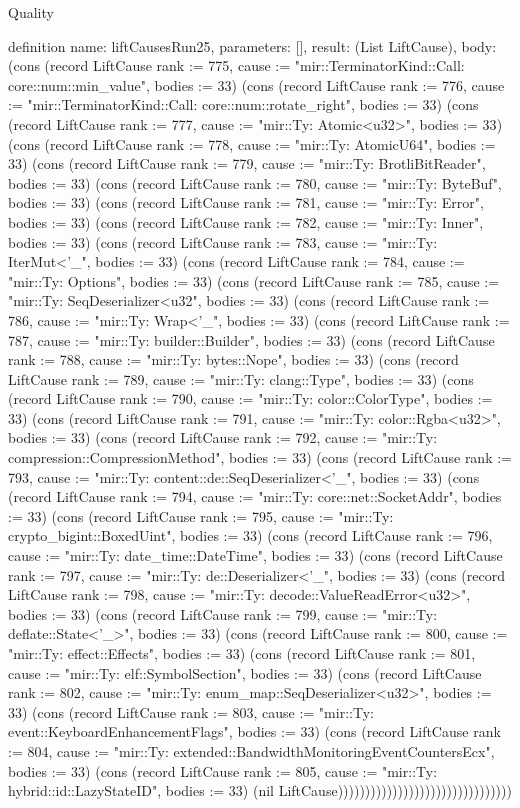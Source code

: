 \begin{lexlean}{Quality}
\begin{semanticmodule}
definition{
  name: liftCausesRun25,
  parameters: [],
  result: (List LiftCause),
  body: (cons (record LiftCause {rank := 775, cause := "mir::TerminatorKind::Call: core::num::min_value", bodies := 33}) (cons (record LiftCause {rank := 776, cause := "mir::TerminatorKind::Call: core::num::rotate_right", bodies := 33}) (cons (record LiftCause {rank := 777, cause := "mir::Ty: Atomic<u32>", bodies := 33}) (cons (record LiftCause {rank := 778, cause := "mir::Ty: AtomicU64", bodies := 33}) (cons (record LiftCause {rank := 779, cause := "mir::Ty: BrotliBitReader", bodies := 33}) (cons (record LiftCause {rank := 780, cause := "mir::Ty: ByteBuf", bodies := 33}) (cons (record LiftCause {rank := 781, cause := "mir::Ty: Error", bodies := 33}) (cons (record LiftCause {rank := 782, cause := "mir::Ty: Inner", bodies := 33}) (cons (record LiftCause {rank := 783, cause := "mir::Ty: IterMut<'_", bodies := 33}) (cons (record LiftCause {rank := 784, cause := "mir::Ty: Options", bodies := 33}) (cons (record LiftCause {rank := 785, cause := "mir::Ty: SeqDeserializer<u32", bodies := 33}) (cons (record LiftCause {rank := 786, cause := "mir::Ty: Wrap<'_", bodies := 33}) (cons (record LiftCause {rank := 787, cause := "mir::Ty: builder::Builder", bodies := 33}) (cons (record LiftCause {rank := 788, cause := "mir::Ty: bytes::Nope", bodies := 33}) (cons (record LiftCause {rank := 789, cause := "mir::Ty: clang::Type", bodies := 33}) (cons (record LiftCause {rank := 790, cause := "mir::Ty: color::ColorType", bodies := 33}) (cons (record LiftCause {rank := 791, cause := "mir::Ty: color::Rgba<u32>", bodies := 33}) (cons (record LiftCause {rank := 792, cause := "mir::Ty: compression::CompressionMethod", bodies := 33}) (cons (record LiftCause {rank := 793, cause := "mir::Ty: content::de::SeqDeserializer<'_", bodies := 33}) (cons (record LiftCause {rank := 794, cause := "mir::Ty: core::net::SocketAddr", bodies := 33}) (cons (record LiftCause {rank := 795, cause := "mir::Ty: crypto_bigint::BoxedUint", bodies := 33}) (cons (record LiftCause {rank := 796, cause := "mir::Ty: date_time::DateTime", bodies := 33}) (cons (record LiftCause {rank := 797, cause := "mir::Ty: de::Deserializer<'_", bodies := 33}) (cons (record LiftCause {rank := 798, cause := "mir::Ty: decode::ValueReadError<u32>", bodies := 33}) (cons (record LiftCause {rank := 799, cause := "mir::Ty: deflate::State<'_>", bodies := 33}) (cons (record LiftCause {rank := 800, cause := "mir::Ty: effect::Effects", bodies := 33}) (cons (record LiftCause {rank := 801, cause := "mir::Ty: elf::SymbolSection", bodies := 33}) (cons (record LiftCause {rank := 802, cause := "mir::Ty: enum_map::SeqDeserializer<u32>", bodies := 33}) (cons (record LiftCause {rank := 803, cause := "mir::Ty: event::KeyboardEnhancementFlags", bodies := 33}) (cons (record LiftCause {rank := 804, cause := "mir::Ty: extended::BandwidthMonitoringEventCountersEcx", bodies := 33}) (cons (record LiftCause {rank := 805, cause := "mir::Ty: hybrid::id::LazyStateID", bodies := 33}) (nil LiftCause))))))))))))))))))))))))))))))))
}


\end{semanticmodule}
\end{lexlean}
